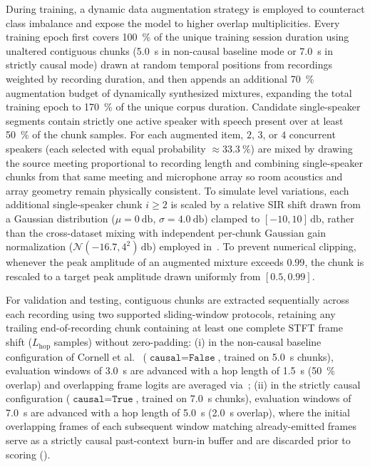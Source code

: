 \documentclass[lettersize,journal]{IEEEtran}
\begin{document}
During training, a dynamic data augmentation strategy is employed
to counteract class imbalance and expose the model to higher overlap multiplicities.
Every training epoch first covers \SI{100}{\percent} of the unique training session duration using unaltered contiguous chunks (\SI{5.0}{\second} in non-causal baseline mode or \SI{7.0}{\second} in strictly causal mode) drawn at random temporal positions from recordings weighted by recording duration, and then appends an additional \SI{70}{\percent} augmentation budget of dynamically synthesized mixtures, expanding the total training epoch to \SI{170}{\percent} of the unique corpus duration.
Candidate single-speaker segments contain strictly one active speaker with speech present over at least \SI{50}{\percent} of the chunk samples. For each augmented item, $2$, $3$, or $4$ concurrent speakers (each selected with equal probability $\approx \SI{33.3}{\percent}$) are mixed by drawing the source meeting proportional to recording length and combining single-speaker chunks from that same meeting and microphone array so room acoustics and array geometry remain physically consistent.
To simulate level variations, each additional single-speaker chunk $i \ge 2$
is scaled by a relative \gls{SIR} shift drawn from a Gaussian distribution
($\mu = \SI{0}{\decibel}$, $\sigma = \SI{4.0}{\decibel}$) clamped to $[-10, 10]\,\si{\decibel}$, rather than the cross-dataset mixing with independent per-chunk Gaussian gain normalization ($\mathcal{N}(-16.7, 4^2)\,\si{\decibel}$) employed in~\cite{cornell2022overlapped}.
To prevent numerical clipping, whenever the peak amplitude of an augmented mixture exceeds $0.99$,
the chunk is rescaled to a target peak amplitude drawn uniformly from $[0.5, 0.99]$.

For validation and testing, contiguous chunks are extracted sequentially across each recording using two supported sliding-window protocols, retaining any trailing end-of-recording chunk containing at least one complete \gls{STFT} frame shift ($L_{\mathrm{hop}}$ samples) without zero-padding:
(i) in the non-causal baseline configuration of Cornell et al.~\cite{cornell2022overlapped} ($\texttt{causal} = \texttt{False}$, trained on \SI{5.0}{\second} chunks), evaluation windows of \SI{3.0}{\second} are advanced with a hop length of \SI{1.5}{\second} (\SI{50}{\percent} overlap) and overlapping frame logits are averaged via~;
(ii) in the strictly causal configuration ($\texttt{causal} = \texttt{True}$, trained on \SI{7.0}{\second} chunks), evaluation windows of \SI{7.0}{\second} are advanced with a hop length of \SI{5.0}{\second} (\SI{2.0}{\second} overlap), where the initial overlapping frames of each subsequent window matching already-emitted frames serve as a strictly causal past-context burn-in buffer and are discarded prior to scoring ().
\end{document}
